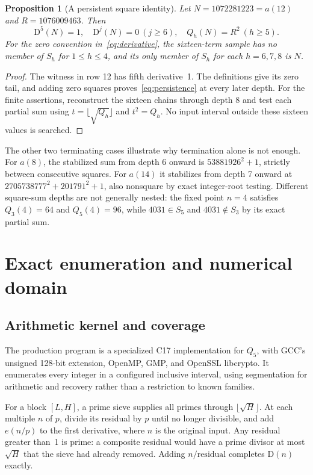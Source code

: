 \documentclass[11pt,a4paper]{article}
\newcommand{\D}{\mathrm{D}}
\newtheorem{proposition}[theorem]{Proposition}
\theoremstyle{definition}
\theoremstyle{remark}
\begin{document}
\begin{proposition}[A persistent square identity]\label{prop:tail}
Let $N=1072281223=a(12)$ and $R=1076009463$. Then
\begin{equation}\label{eq:persistence}
 \D^5(N)=1,\quad \D^j(N)=0\ (j\ge6),\quad Q_h(N)=R^2\ (h\ge5).
\end{equation}
For the zero convention in~\eqref{eq:derivative}, the sixteen-term
sample has no member of $S_h$ for $1\le h\le4$, and its only member
of $S_h$ for each $h=6,7,8$ is $N$.
\end{proposition}
\begin{proof}
The witness in row 12 has fifth derivative~1. The definitions give its
zero tail, and adding zero squares proves~\eqref{eq:persistence} at every
later depth. For the finite assertions, reconstruct the sixteen chains
through depth 8 and test each partial sum using $t=\lfloor\sqrt{Q_h}\rfloor$
and $t^2=Q_h$. No input interval outside these sixteen values is searched.
\end{proof}

The other two terminating cases illustrate why termination alone is not
enough. For $a(8)$, the stabilized sum from depth 6 onward is
$53881926^2+1$, strictly between consecutive squares. For $a(14)$ it
stabilizes from depth 7 onward at
$2705738777^2+201791^2+1$, also nonsquare by exact integer-root testing.
Different square-sum depths are not generally nested: the fixed point
$n=4$ satisfies $Q_3(4)=64$ and $Q_5(4)=96$, while $4031\in S_5$
and $4031\notin S_3$ by its exact partial sum.

\section{Exact enumeration and numerical domain}\label{sec:algorithm}

\subsection{Arithmetic kernel and coverage}
The production program is a specialized C17 implementation for $Q_5$,
with GCC's unsigned 128-bit extension, OpenMP, GMP, and OpenSSL libcrypto.
It enumerates every integer in a configured inclusive interval, using
segmentation for arithmetic and recovery rather than a restriction to
known families.

For a block $[L,H]$, a prime sieve supplies all primes through
$\lfloor\sqrt H\rfloor$. At each multiple $n$ of $p$, divide its residual
by $p$ until no longer divisible, and add $e(n/p)$ to the first derivative,
where $n$ is the original input. Any residual greater than~1 is prime:
a composite residual would have a prime divisor at most $\sqrt H$ that
the sieve had already removed. Adding $n/\text{residual}$ completes
$\D(n)$ exactly.
\end{document}
